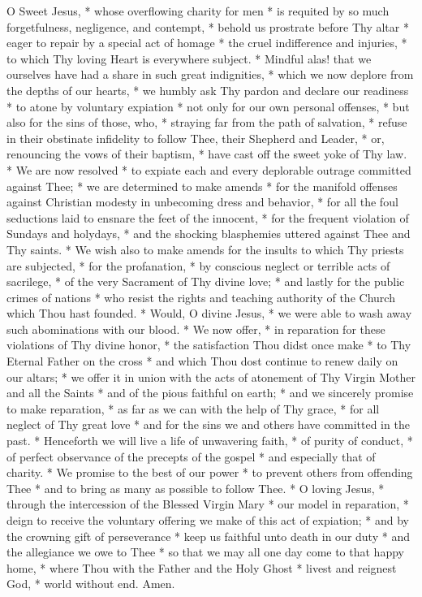 \documentclass[statementpaper, 11pt]{memoir}
\begin{document}
 O Sweet Jesus, * whose overflowing charity
for men * is requited by so much forgetfulness, negligence, and contempt, *
behold us prostrate before Thy altar * eager to repair by a special act of
homage * the cruel indifference and injuries, * to which Thy loving Heart is
everywhere subject. * Mindful alas! that we ourselves have had a share in such
great indignities, * which we now deplore from the depths of our hearts, * we
humbly ask Thy pardon and declare our readiness * to atone by voluntary
expiation * not only for our own personal offenses, * but also for the sins of
those, who, * straying far from the path of salvation, * refuse in their
obstinate infidelity to follow Thee, their Shepherd and Leader, * or,
renouncing the vows of their baptism, * have cast off the sweet yoke of Thy
law. * We are now resolved * to expiate each and every deplorable outrage
committed against Thee; * we are determined to make amends * for the manifold
offenses against Christian modesty in unbecoming dress and behavior, * for all
the foul seductions laid to ensnare the feet of the innocent, * for the
frequent violation of Sundays and holydays, * and the shocking blasphemies
uttered against Thee and Thy saints. * We wish also to make amends for the
insults to which Thy priests are subjected, * for the profanation, * by
conscious neglect or terrible acts of sacrilege, * of the very Sacrament of Thy
divine love; * and lastly for the public crimes of nations * who resist the
rights and teaching authority of the Church which Thou hast founded. * Would, O
divine Jesus, * we were able to wash away such abominations with our blood. *
We now offer, * in reparation for these violations of Thy divine honor, * the
satisfaction Thou didst once make * to Thy Eternal Father on the cross * and
which Thou dost continue to renew daily on our altars; * we offer it in union
with the acts of atonement of Thy Virgin Mother and all the Saints * and of the
pious faithful on earth; * and we sincerely promise to make reparation, * as
far as we can with the help of Thy grace, * for all neglect of Thy great love *
and for the sins we and others have committed in the past. * Henceforth we will
live a life of unwavering faith, * of purity of conduct, * of perfect
observance of the precepts of the gospel * and especially that of charity. * We
promise to the best of our power * to prevent others from offending Thee * and
to bring as many as possible to follow Thee. * O loving Jesus, * through the
intercession of the Blessed Virgin Mary * our model in reparation, * deign to
receive the voluntary offering we make of this act of expiation; * and by the
crowning gift of perseverance * keep us faithful unto death in our duty * and
the allegiance we owe to Thee * so that we may all one day come to that happy
home, * where Thou with the Father and the Holy Ghost * livest and reignest
God, * world without end. Amen.
\end{document}

